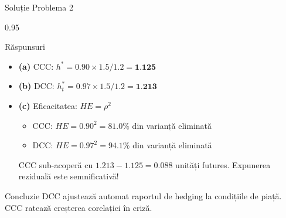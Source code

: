 \documentclass[9pt, aspectratio=169, t]{beamer}
\begin{document}
\begin{frame}{Soluție Problema 2}
    \begin{cminipage}{0.95\textwidth}
    \begin{exampleblock}{Răspunsuri}
        \begin{itemize}\setlength{\itemsep}{0pt}
            \item \textbf{(a)} CCC: $h^* = 0.90 \times 1.5/1.2 = \textbf{1.125}$

            \vspace{0.2cm}

            \item \textbf{(b)} DCC: $h_t^* = 0.97 \times 1.5/1.2 = \textbf{1.213}$

            \vspace{0.2cm}

            \item \textbf{(c)} Eficacitatea: $HE = \rho^2$
            \begin{itemize}\setlength{\itemsep}{0pt}
                \item CCC: $HE = 0.90^2 = 81.0\%$ din varianță eliminată
                \item DCC: $HE = 0.97^2 = 94.1\%$ din varianță eliminată
            \end{itemize}

            \vspace{0.2cm}

            CCC sub-acoperă cu $1.213 - 1.125 = 0.088$ unități futures. Expunerea reziduală este semnificativă!
        \end{itemize}
    \end{exampleblock}

    \begin{alertblock}{Concluzie}
        DCC ajustează automat raportul de hedging la condițiile de piață. CCC ratează creșterea corelației în criză.
    \end{alertblock}
    \end{cminipage}
\end{frame}
\end{document}
